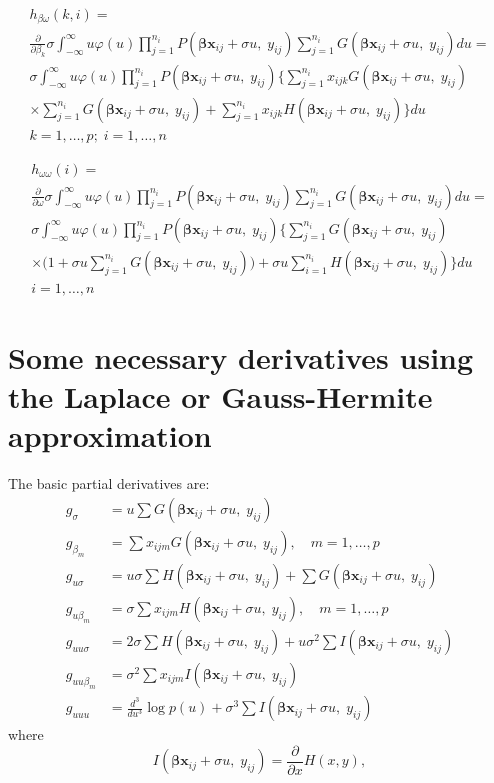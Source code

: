 \documentclass[a4paper,11pt]{article}
\newcommand{\bx}{\ensuremath{\mathbf{x}}}
\newcommand{\bb}{\ensuremath{\boldsymbol{\beta}}}
\newcommand{\Py}{\ensuremath{P(\bb\bx_{ij} + \sigma u, \; y_{ij})}}
\newcommand{\Gy}{\ensuremath{G(\bb\bx_{ij} + \sigma u, \; y_{ij})}}
\newcommand{\dGy}{\ensuremath{H(\bb\bx_{ij} + \sigma u, \; y_{ij})}}
\newcommand{\Iy}{\ensuremath{I(\bb\bx_{ij} + \sigma u, \; y_{ij})}}
\newcommand{\be}{\begin{equation}}
\newcommand{\ee}{\end{equation}}
\begin{document}
\begin{multline*}
h_{\beta\omega}(k, i) = \\
\frac{\partial}{\partial \beta_k} \sigma \int_{-\infty}^{\infty} u \varphi(u)
\prod_{j = 1}^{n_i} \Py \sum_{j=1}^{n_i}
\Gy du = \\
\sigma \int_{-\infty}^{\infty} u \varphi(u)
\prod_{j = 1}^{n_i} \Py \bigg\{\sum_{j=1}^{n_i}
x_{ijk} \Gy \\
\times \sum_{j=1}^{n_i} \Gy
+ \sum_{j=1}^{n_i}
x_{ijk} \dGy \bigg\} du \\
k = 1, \ldots, p; \; i = 1, \ldots, n
\end{multline*}

\begin{multline*}
h_{\omega\omega}(i) = \\
\frac{\partial}{\partial \omega} \sigma \int_{-\infty}^{\infty} u \varphi(u)
\prod_{j = 1}^{n_i} \Py \sum_{j=1}^{n_i}
\Gy du = \\
\sigma \int_{-\infty}^{\infty} u \varphi(u)
\prod_{j = 1}^{n_i} \Py \bigg\{\sum_{j=1}^{n_i}
\Gy \\
\times \big(1 + \sigma u \sum_{j=1}^{n_i} \Gy\big) +
\sigma u \sum_{i=1}^{n_i} \dGy\bigg\} du \\
i = 1, \ldots, n
\end{multline*}


\section{Some necessary derivatives using the Laplace or Gauss-Hermite
  approximation} 

The basic partial derivatives are:
\be
\begin{split}
g_{\sigma} &= u \sum \Gy \\
g_{\beta_m} &= \sum x_{ijm} \Gy, \quad m = 1, \ldots, p \\
g_{u\sigma} &= u \sigma \sum \dGy + \sum \Gy \\ 
g_{u\beta_m} &= \sigma \sum x_{ijm} \dGy, \quad m = 1, \ldots, p
\\
g_{uu\sigma} &= 2\sigma \sum \dGy + u \sigma^2 \sum \Iy \\
g_{uu\beta_m} &= \sigma^2 \sum x_{ijm} \Iy \\
g_{uuu} &= \frac{d^3}{d u^3}\log p(u) + \sigma^3 \sum \Iy
\end{split}
\ee  
where
\be
\Iy = \frac{\partial}{\partial x} H(x, y),
\ee
\end{document}
